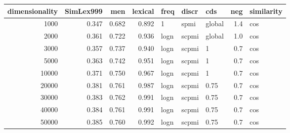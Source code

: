 \begin{tabular}{rrrrlllrl}
\toprule
 dimensionality &  SimLex999 &    men &  lexical &  freq &  discr &     cds &  neg & similarity \\
\midrule
           1000 &      0.347 &  0.682 &    0.892 &     1 &   spmi &  global &  1.4 &        cos \\
           2000 &      0.361 &  0.722 &    0.936 &  logn &  scpmi &  global &  1.0 &        cos \\
           3000 &      0.357 &  0.737 &    0.940 &  logn &  scpmi &       1 &  0.7 &        cos \\
           5000 &      0.363 &  0.742 &    0.951 &  logn &  scpmi &       1 &  0.7 &        cos \\
          10000 &      0.371 &  0.750 &    0.967 &  logn &  scpmi &       1 &  0.7 &        cos \\
          20000 &      0.381 &  0.761 &    0.987 &  logn &  scpmi &    0.75 &  0.7 &        cos \\
          30000 &      0.383 &  0.762 &    0.991 &  logn &  scpmi &    0.75 &  0.7 &        cos \\
          40000 &      0.384 &  0.761 &    0.991 &  logn &  scpmi &    0.75 &  0.7 &        cos \\
          50000 &      0.385 &  0.760 &    0.992 &  logn &  scpmi &    0.75 &  0.7 &        cos \\
\bottomrule
\end{tabular}
